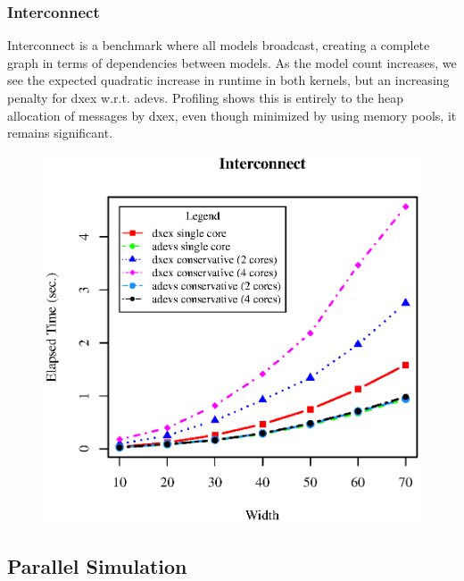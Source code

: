 \subsubsection{Interconnect}
Interconnect \cite{van2013research} is a benchmark where all models broadcast, creating a complete graph in terms of dependencies between models. As the model count increases, we see the expected quadratic increase in runtime in both kernels, but an increasing penalty for dxex w.r.t. adevs. Profiling shows this is entirely to the heap allocation of messages by dxex, even though minimized by using memory pools, it remains significant.\\
\begin{figure}[h]
	\includegraphics[width=.5\textwidth]{fig/fig3.eps}
	\label{fig3.eps}
\end{figure}

\subsection{Parallel Simulation}
